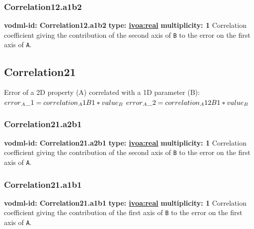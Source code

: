     \subsubsection{Correlation12.a1b2}
      \textbf{vodml-id: Correlation12.a1b2} \newline
      \textbf{type: \hyperref[sect:ivoa]{ivoa:real}} \newline
      \textbf{multiplicity: 1} \newline 
      Correlation coefficient giving the contribution of the second axis of \texttt{B} to the error on the first axis of \texttt{A}.

  \subsection{Correlation21}
  \label{sect:Correlation21}
    Error of a 2D property (A) correlated with a 1D parameter (B): $error\\_A\_1 = correlation\\_A1B1 * value\\_B$ $error\\_A\_2 = correlation\\_A12B1 * value\\_B$

    \subsubsection{Correlation21.a2b1}
      \textbf{vodml-id: Correlation21.a2b1} \newline
      \textbf{type: \hyperref[sect:ivoa]{ivoa:real}} \newline
      \textbf{multiplicity: 1} \newline 
      Correlation coefficient giving the contribution of the second axis of \texttt{B} to the error on the first axis of \texttt{A}.

    \subsubsection{Correlation21.a1b1}
      \textbf{vodml-id: Correlation21.a1b1} \newline
      \textbf{type: \hyperref[sect:ivoa]{ivoa:real}} \newline
      \textbf{multiplicity: 1} \newline 
      Correlation coefficient giving the contribution of the first axis of \texttt{B} to the error on the first axis of \texttt{A}.

